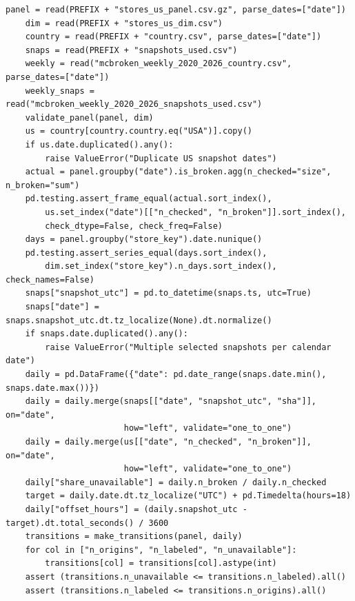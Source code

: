 \begin{Verbatim}[breaklines,breakanywhere,fontsize=\small]
    panel = read(PREFIX + "stores_us_panel.csv.gz", parse_dates=["date"])
    dim = read(PREFIX + "stores_us_dim.csv")
    country = read(PREFIX + "country.csv", parse_dates=["date"])
    snaps = read(PREFIX + "snapshots_used.csv")
    weekly = read("mcbroken_weekly_2020_2026_country.csv", parse_dates=["date"])
    weekly_snaps = read("mcbroken_weekly_2020_2026_snapshots_used.csv")
    validate_panel(panel, dim)
    us = country[country.country.eq("USA")].copy()
    if us.date.duplicated().any():
        raise ValueError("Duplicate US snapshot dates")
    actual = panel.groupby("date").is_broken.agg(n_checked="size", n_broken="sum")
    pd.testing.assert_frame_equal(actual.sort_index(),
        us.set_index("date")[["n_checked", "n_broken"]].sort_index(),
        check_dtype=False, check_freq=False)
    days = panel.groupby("store_key").date.nunique()
    pd.testing.assert_series_equal(days.sort_index(),
        dim.set_index("store_key").n_days.sort_index(), check_names=False)
    snaps["snapshot_utc"] = pd.to_datetime(snaps.ts, utc=True)
    snaps["date"] = snaps.snapshot_utc.dt.tz_localize(None).dt.normalize()
    if snaps.date.duplicated().any():
        raise ValueError("Multiple selected snapshots per calendar date")
    daily = pd.DataFrame({"date": pd.date_range(snaps.date.min(), snaps.date.max())})
    daily = daily.merge(snaps[["date", "snapshot_utc", "sha"]], on="date",
                        how="left", validate="one_to_one")
    daily = daily.merge(us[["date", "n_checked", "n_broken"]], on="date",
                        how="left", validate="one_to_one")
    daily["share_unavailable"] = daily.n_broken / daily.n_checked
    target = daily.date.dt.tz_localize("UTC") + pd.Timedelta(hours=18)
    daily["offset_hours"] = (daily.snapshot_utc - target).dt.total_seconds() / 3600
    transitions = make_transitions(panel, daily)
    for col in ["n_origins", "n_labeled", "n_unavailable"]:
        transitions[col] = transitions[col].astype(int)
    assert (transitions.n_unavailable <= transitions.n_labeled).all()
    assert (transitions.n_labeled <= transitions.n_origins).all()


\end{Verbatim}
